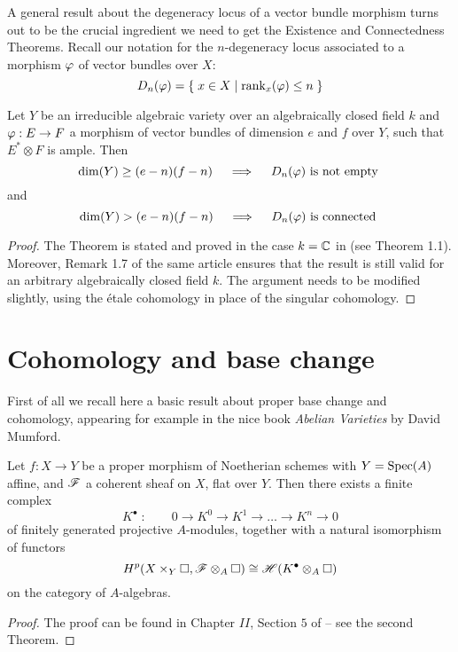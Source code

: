 	A general result about the degeneracy locus of a vector bundle morphism turns out to be the crucial ingredient we need to get the Existence and Connectedness Theorems. Recall our notation for the $n$-degeneracy locus associated to a morphism $\varphi$ of vector bundles over $X$:
	$$ D_{n} (\varphi) = \left\{\;  x\in X \mid \operatorname{rank}_x(\varphi) \leq n  \; \right\} $$
	\begin{theo}\label{theo:alg}
		Let $Y$ be an irreducible algebraic variety over an algebraically closed field $k$ and $ \varphi: E\to F $
		a morphism of vector bundles of dimension $e$ and $f$ over $Y$, such that $ E^*\otimes F$ is ample. Then
			$$ \dim(Y) \geq (e-n)(f-n) \quad\implies\quad D_{n} (\varphi) \text{ is not empty } $$
		and
			$$ \dim(Y) > (e-n)(f-n) \quad\implies\quad D_{n} (\varphi) \text{ is connected } $$
	\end{theo}
	\begin{proof}
		The Theorem is stated and proved in the case $k=\mathbb{C}$ in \cite{FULTON} (see Theorem 1.1). Moreover, Remark 1.7 of the same article ensures that the result is still valid for an arbitrary algebraically closed field $k$. The argument needs to be modified slightly, using the \'etale cohomology in place of the singular cohomology.
	\end{proof}

\section{Cohomology and base change}
	First of all we recall here a basic result about proper base change and cohomology, appearing for example in the nice book \emph{Abelian Varieties} by David Mumford.
	\begin{namedtheo}
		Let $f:X\to Y$ be a proper morphism of Noetherian schemes with $Y=\operatorname{Spec}(A)$ affine, and $\mathscr{F}$ a coherent sheaf on $X$, flat over $Y$. Then there exists a finite complex
		$$ K^\bullet \;:\qquad 0\to K^0\to K^1 \to\dots\to K^n \to 0 $$
		of finitely generated projective $A$-modules, together with a natural isomorphism of functors
		$$ H^p(X\times_Y \square, \mathscr{F}\otimes_A \square) \cong \mathscr{H}(K^\bullet \otimes_A \square) $$
		on the category of $A$-algebras.
	\end{namedtheo}
	\begin{proof}
		The proof can be found in Chapter $II$, Section $5$ of \cite{MUMAV} -- see the second Theorem.
	\end{proof}	

